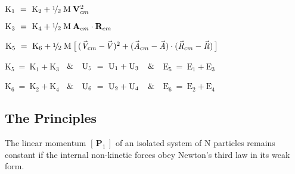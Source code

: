 \documentclass[10pt]{article}
\newcommand{\med}{\raise.5ex\hbox{$\scriptstyle 1$}\kern-.15em/\kern-.09em\lower.25ex\hbox{$\scriptstyle 2$}}
\begin{document}
\par \noindent ${\mathrm{K}}_1 ~=~ {\mathrm{K}}_2 + \med \; {\mathrm{M}} \: {\mathbf{V}}_{cm}^{\hspace{+0.045em}2}$
\vspace{+0.99em}
\par \noindent ${\mathrm{K}}_3 ~=~ {\mathrm{K}}_4 + \med \; {\mathrm{M}} \: {\mathbf{A}}_{cm} \cdot {\mathbf{R}}_{cm}$
\vspace{+0.99em}
\par \noindent ${\mathrm{K}}_5 ~=~ {\mathrm{K}}_6 + \med \; {\mathrm{M}} \: \big [ \, ({\vec{\mathit{V}}}_{cm} - \hspace{-0.120em}{\vec{\mathit{V}}})^2 + ({\vec{\mathit{A}}}_{cm} - {\vec{\mathit{A}}}) \cdot ({\vec{\mathit{R}}}_{cm} - {\vec{\mathit{R}}}) \, \big ]$
\vspace{+0.99em}
\par \noindent ${\mathrm{K}}_5 ~=~ {\mathrm{K}}_1 + {\mathrm{K}}_3$ $\hspace{+0.540em} \& \hspace{+0.540em}$ ${\mathrm{U}}_5 ~=~ {\mathrm{U}}_1 \hspace{+0.027em}+\hspace{+0.027em} {\mathrm{U}}_3$ $\hspace{+0.630em} \& \hspace{+0.630em}$ ${\mathrm{E}}_5 ~=~ {\mathrm{E}}_1 + {\mathrm{E}}_3$
\vspace{+0.99em}
\par \noindent ${\mathrm{K}}_6 ~=~ {\mathrm{K}}_2 + {\mathrm{K}}_4$ $\hspace{+0.540em} \& \hspace{+0.540em}$ ${\mathrm{U}}_6 ~=~ {\mathrm{U}}_2 \hspace{+0.027em}+\hspace{+0.027em} {\mathrm{U}}_4$ $\hspace{+0.630em} \& \hspace{+0.630em}$ ${\mathrm{E}}_6 ~=~ {\mathrm{E}}_2 + {\mathrm{E}}_4$

\newpage

\par {\centering\subsection*{The Principles}}

\par \bigskip\smallskip \noindent The linear momentum $[ \, {\mathbf{P}}_1 \, ]$ of an isolated system of N particles remains constant if the internal non-kinetic forces obey Newton's third law in its weak form.
\end{document}
